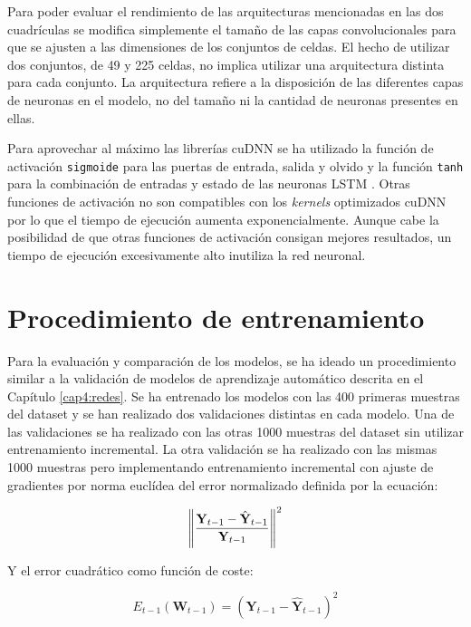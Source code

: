 Para poder evaluar el rendimiento de las arquitecturas mencionadas en las dos cuadrículas se modifica simplemente el tamaño de las capas convolucionales para que se ajusten a las dimensiones de los conjuntos de celdas. El hecho de utilizar dos conjuntos, de 49 y 225 celdas, no implica utilizar una arquitectura distinta para cada conjunto. La arquitectura refiere a la disposición de las diferentes capas de neuronas en el modelo, no del tamaño ni la cantidad de neuronas presentes en ellas.

Para aprovechar al máximo las librerías cuDNN se ha utilizado la función de activación \texttt{sigmoide} para las puertas de entrada, salida y olvido y la función \texttt{tanh} para la combinación de entradas y estado de las neuronas LSTM \cite{lstmactivation,nvidiacudnn}. Otras funciones de activación no son compatibles con los \textit{kernels} optimizados cuDNN por lo que el tiempo de ejecución aumenta exponencialmente. Aunque cabe la posibilidad de que otras funciones de activación consigan mejores resultados, un tiempo de ejecución excesivamente alto inutiliza la red neuronal.

\section{Procedimiento de entrenamiento}
Para la evaluación y comparación de los modelos, se ha ideado un procedimiento similar a la validación de modelos de aprendizaje automático descrita en el Capítulo \ref{cap4:redes}. Se ha entrenado los modelos con las 400 primeras muestras del dataset y se han realizado dos validaciones distintas en cada modelo. Una de las validaciones se ha realizado con las otras 1000 muestras del dataset sin utilizar entrenamiento incremental. La otra validación se ha realizado con las mismas 1000 muestras pero implementando entrenamiento incremental con ajuste de gradientes por norma euclídea del error normalizado \cite{SKIMAcasaseca} definida por la ecuación:

\begin{equation}
	\norm{\frac{\textbf{Y}_{t-1}-\hat{\textbf{Y}}_{t-1}}{\textbf{Y}_{t-1}}}^2
	\label{eq:euclideannorm}
\end{equation}

Y el error cuadrático como función de coste:

\begin{equation}
	E_{t-1}(\textbf{W}_{t-1})=(\textbf{Y}_{t-1}-\hat{\textbf{Y}}_{t-1})^2
\end{equation}

